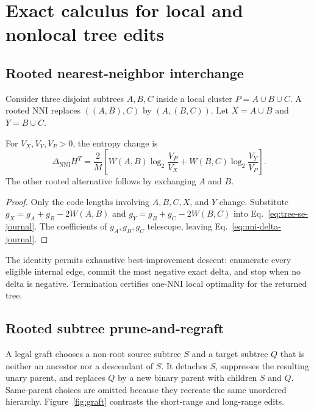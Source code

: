 \section{Exact calculus for local and nonlocal tree edits}
\label{sec:calculus}

\subsection{Rooted nearest-neighbor interchange}

Consider three disjoint subtrees $A,B,C$ inside a local cluster
$P=A\cup B\cup C$. A rooted NNI replaces $((A,B),C)$ by
$(A,(B,C))$. Let $X=A\cup B$ and $Y=B\cup C$.

\begin{proposition}\label{prop:nni-delta-journal}
For $V_X,V_Y,V_P>0$, the entropy change is
\begin{equation}
 \Delta_{\mathrm{NNI}} H^T=
 \frac{2}{M}\left[
 W(A,B)\log_2\frac{V_P}{V_X}+
 W(B,C)\log_2\frac{V_Y}{V_P}
 \right].
 \label{eq:nni-delta-journal}
\end{equation}
The other rooted alternative follows by exchanging $A$ and $B$.
\end{proposition}

\begin{proof}
Only the code lengths involving $A,B,C,X$, and $Y$ change. Substitute
$g_X=g_A+g_B-2W(A,B)$ and
$g_Y=g_B+g_C-2W(B,C)$ into
Eq.~\eqref{eq:tree-se-journal}. The coefficients of $g_A,g_B,g_C$ telescope,
leaving Eq.~\eqref{eq:nni-delta-journal}.
\end{proof}

The identity permits exhaustive best-improvement descent: enumerate every
eligible internal edge, commit the most negative exact delta, and stop when no
delta is negative. Termination certifies one-NNI local optimality for the
returned tree.

\subsection{Rooted subtree prune-and-regraft}

A legal graft chooses a non-root source subtree $S$ and a target subtree $Q$
that is neither an ancestor nor a descendant of $S$. It detaches $S$,
suppresses the resulting unary parent, and replaces $Q$ by a new binary parent
with children $S$ and $Q$. Same-parent choices are omitted because they
recreate the same unordered hierarchy. Figure~\ref{fig:graft} contrasts the
short-range and long-range edits.

